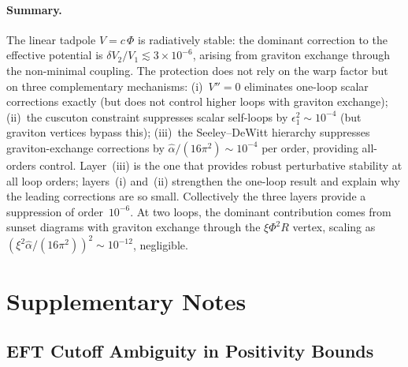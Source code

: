 \paragraph{Summary.}
The linear tadpole $V = c\,\Phi$ is radiatively stable: the dominant correction to the effective potential is $\delta V_2 / V_1 \lesssim 3 \times 10^{-6}$, arising from graviton exchange through the non-minimal coupling. The protection does not rely on the warp factor but on three complementary mechanisms: (i)~$V'' = 0$ eliminates one-loop scalar corrections exactly (but does not control higher loops with graviton exchange); (ii)~the cuscuton constraint suppresses scalar self-loops by $\epsilon_1^2 \sim 10^{-4}$ (but graviton vertices bypass this); (iii)~the Seeley--DeWitt hierarchy suppresses graviton-exchange corrections by $\hat{\alpha}/(16\pi^2) \sim 10^{-4}$ per order, providing all-orders control. Layer~(iii) is the one that provides robust perturbative stability at all loop orders; layers~(i) and~(ii) strengthen the one-loop result and explain why the leading corrections are so small. Collectively the three layers provide a suppression of order~$10^{-6}$. At two loops, the dominant contribution comes from sunset diagrams with graviton exchange through the $\xi\Phi^2 R$ vertex, scaling as $(\xi^2 \hat{\alpha}/(16\pi^2))^2 \sim 10^{-12}$, negligible.


\section{Supplementary Notes}
\label{app:supplementary}

\subsection{EFT Cutoff Ambiguity in Positivity Bounds}
\label{app:eft-cutoff}

